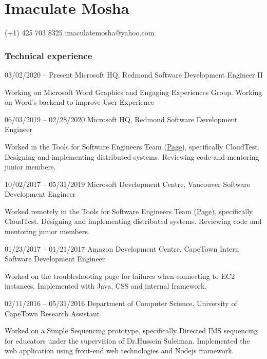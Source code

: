 \documentclass[fontsize=9pt]{tccv}
\begin{document}
\part{Imaculate Mosha}

    {(+1) 425 703 8325}
    {imaculatemosha@yahoo.com}

\section{Technical experience}

\begin{eventlist}
\item{03/02/2020 -- Present}
	{Microsoft HQ, Redmond}
	 {Software Development Engineer II}

Working on Microsoft Word Graphics and Engaging Experiences Group.
Working on Word's backend to improve User Experience


\item{06/03/2019 -- 02/28/2020}
	 {Microsoft HQ, Redmond}
	 {Software Development Engineer}
	 
Worked in the Tools for Software Engineers Team (\href{ https://www.microsoft.com/en-us/research/project/tools-for-software-engineers/}{Page}), specifically CloudTest.
Designing and implementing distributed systems.
Reviewing code and mentoring junior members.

\item{10/02/2017 -- 05/31/2019}
	 {Microsoft Development Centre, Vancouver}
	 {Software Development Engineer}
	 
Worked remotely in the Tools for Software Engineers Team (\href{ https://www.microsoft.com/en-us/research/project/tools-for-software-engineers/}{Page}), specifically CloudTest.
Designing and implementing distributed systems.
Reviewing code and mentoring junior members.


\item{01/23/2017 -- 01/21/2017}
	 {Amazon Development Centre, CapeTown}
	 {Intern Software Development Engineer}
	 
Worked on the troubleshooting page for failures when connecting to EC2 instances.
Implemented with Java, CSS and internal framework.


\item{02/11/2016 -- 05/31/2016}
	 {Department of Computer Science, University of CapeTown}
	 {Research Assistant}
	 
Worked on a Simple Sequencing prototype, specifically Directed IMS sequencing for educators under the supervision of Dr.Hussein Suleiman.  
Implemented the web application using front-end web technologies and Nodejs framework. 



\end{eventlist}
\end{document}
